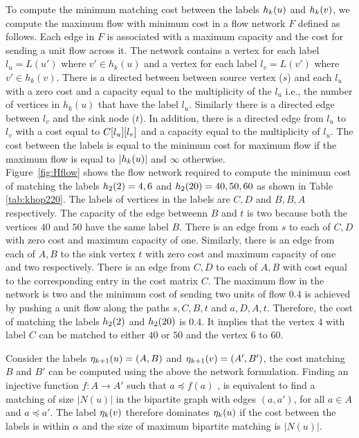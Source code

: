  To compute the minimum matching
cost between the \khop labels $h_{k}(u)$ and $h_{k}(v)$, we compute the
maximum flow with minimum cost in a flow network $F$ defined as follows.  Each
edge in $F$ is associated with a maximum capacity and the cost for sending a
unit flow across it.  The network contains a vertex for each label $l_u =
L(u')$ where $v' \in h_k(u)$ and a vertex for each label $l_v = L(v')$ where $v'
\in h_k(v)$. There is a directed between between source vertex ($s$) and each
$l_u$ with a zero cost and a capacity equal to the multiplicity of the $l_u$
i.e., the number of vertices in $h_k(u)$ that have the label $l_u$. Similarly
there is a directed edge between $l_v$ and the sink node ($t$). In addition,
there is a directed edge from $l_u$ to $l_v$ with a cost
equal to ${C}[l_u][l_v]$ and a capacity equal to the
multiplicity of $l_u$. The cost between the \khop labels is equal to
the minimum cost for maximum flow if the maximum flow is equal to
$|h_{k}(u)|$ and $\infty$ otherwise.  \\ Figure~\ref{fig:Hflow} shows the
flow network required to compute the minimum cost of matching the \khop labels
$h_{2}(2) = 4,6 $ and $h_{2}(20) = 40, 50, 60$ as shown in Table
\ref{tab:khop220}. The labels of vertices in the \khop labels are $C,D$ and $B,
B, A$ respectively. The capacity of the edge betweenn $B$ and $t$ is two because 
both the vertices $40$ and $50$ have the same label $B$.
There is an edge from $s$ to each of $C, D$ with zero cost
and maximum capacity of one.  Similarly, there is an edge from each of $A, B$ to
the sink vertex $t$ with zero cost and maximum capacity of one and two
respectively. There is an edge from $C, D$ to each of $A, B$ with cost equal to
the corresponding entry in the cost matrix $C$. The maximum flow in the network
is two and the minimum cost of sending two units of flow $0.4$ is achieved by
pushing a unit flow along the paths $s, C, B, t$ and $a, D, A, t$.  Therefore,
the cost of matching the labels $h_{2}(2)$ and $h_{2}(20)$ is $0.4$. It
implies that the vertex $4$ with label $C$ can be matched to either $40$ or $50$
and the vertex $6$ to $60$.

 Consider the 
\ncl labels $\eta_{k+1}(u) = (A, B)$ and  $\eta_{k+1}(v) = (A', B')$, the cost matching
$B$ and $B'$ can be computed using the above the network formulation.
Finding an injective function $f\!\!:A \rightarrow A'$ such that $a \preceq
f(a)$ , is equivalent to find a matching of size $|N(u)|$ in the bipartite graph
with edges $(a, a')$, for all $a \in A$ and $a \preceq a'$.
The \ncl label $\eta_{k}(v)$ therefore dominates $\eta_{k}(u)$ if the
cost between the \khop labels is within $\alpha$ and the size of maximum
bipartite matching is $|N(u)|$.

